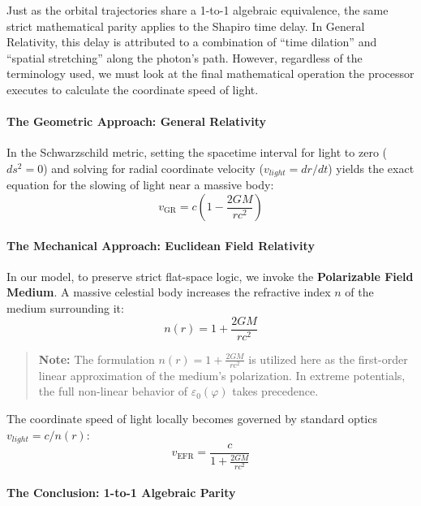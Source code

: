 \documentclass[twocolumn]{article}
\begin{document}
Just as the orbital trajectories share a 1-to-1 algebraic equivalence,
the same strict mathematical parity applies to the Shapiro time delay.
In General Relativity, this delay is attributed to a combination of
``time dilation'' and ``spatial stretching'' along the photon's path.
However, regardless of the terminology used, we must look at the final
mathematical operation the processor executes to calculate the
coordinate speed of light.

\paragraph{The Geometric Approach: General
Relativity}\label{the-geometric-approach-general-relativity}

In the Schwarzschild metric, setting the spacetime interval for light to
zero (\(ds^2 = 0\)) and solving for radial coordinate velocity
(\(v_{light} = dr/dt\)) yields the exact equation for the slowing of
light near a massive body:
\[ v_{\text{GR}} = c \left( 1 - \frac{2GM}{rc^2} \right) \]

\paragraph{The Mechanical Approach: Euclidean Field
Relativity}\label{the-mechanical-approach-euclidean-field-relativity-1}

In our model, to preserve strict flat-space logic, we invoke the
\textbf{Polarizable Field Medium}. A massive celestial body increases
the refractive index \(n\) of the medium surrounding it:
\[ n(r) = 1 + \frac{2GM}{rc^2} \]

\begin{quote}
\textbf{Note:} The formulation \(n(r) = 1 + \frac{2GM}{rc^2}\) is
utilized here as the first-order linear approximation of the medium's
polarization. In extreme potentials, the full non-linear behavior of
\(\varepsilon_0(\varphi)\) takes precedence.
\end{quote}

The coordinate speed of light locally becomes governed by standard
optics \(v_{light} = c / n(r)\):
\[ v_{\text{EFR}} = \frac{c}{1 + \frac{2GM}{rc^2}} \]

\paragraph{The Conclusion: 1-to-1 Algebraic
Parity}\label{the-conclusion-1-to-1-algebraic-parity}
\end{document}
